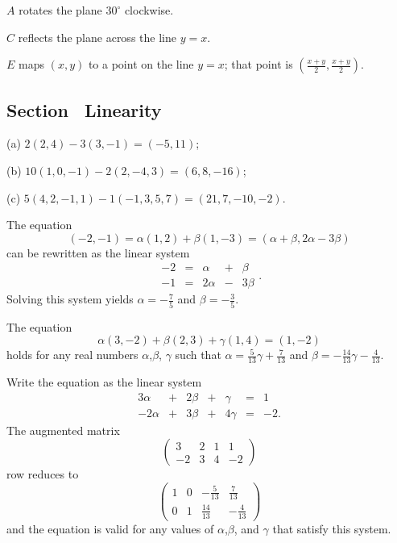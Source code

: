 \documentclass{ximera}
\begin{document}
 $A$ rotates the plane $30^\circ$ clockwise.

 $C$ reflects the plane across the line $y = x$.

 $E$ maps $(x,y)$ to a point on the line $y = x$; that
point is $(\frac{x + y}{2}, \frac{x + y}{2})$.



\subsection*{Section~\protect{\ref{S:linearity}} Linearity}

(a) $2(2,4) - 3(3,-1) = (-5,11)$;

(b) $10(1,0,-1) - 2(2,-4,3) = (6,8,-16)$;

(c) $5(4,2,-1,1) - 1(-1,3,5,7) = (21,7,-10,-2)$.

The equation
\[ (-2, -1) = \alpha(1,2) + \beta(1,-3) =
(\alpha + \beta, 2\alpha - 3\beta ) \]
can be rewritten as the linear system
\[ \begin{array}{rrrrr}
-2 & = & \alpha & + & \beta \\
-1 & = & 2\alpha & - & 3\beta\end{array}. \]
Solving this system yields $\alpha = -\frac{7}{5}$ and
$\beta = -\frac{3}{5}$.

\ans The equation
\[ \alpha(3,-2) + \beta(2,3) + \gamma(1,4) = (1,-2) \]
holds for any real numbers $\alpha$,$\beta$,
$\gamma$ such that $\alpha = \frac{5}{13}\gamma +
\frac{7}{13}$ and $\beta = -\frac{14}{13}\gamma
- \frac{4}{13}$.

\soln Write the equation as the linear system
\[ \begin{array}{rrrrrrl}
3\alpha & + & 2\beta & + & \gamma & = & 1 \\
-2\alpha & + & 3\beta & + & 4\gamma & = & -2. \end{array} \]
The augmented matrix
\[ \left(\begin{array}{rrr|r}
3 & 2 & 1 & 1 \\
-2 & 3 & 4 & -2 \end{array}\right) \]
row reduces to
\[ \left(\begin{array}{rrr|r}
1 & 0 & -\frac{5}{13} & \frac{7}{13} \\
0 & 1 & \frac{14}{13} & -\frac{4}{13} \end{array}\right) \]
and the equation is valid for any values of $\alpha$,$\beta$,
and $\gamma$ that satisfy this system.
\end{document}
